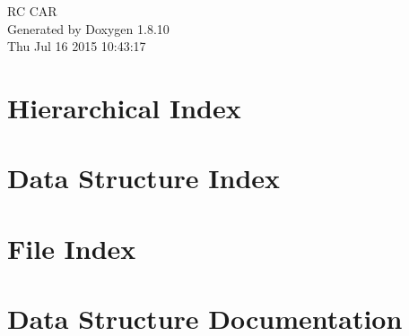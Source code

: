\documentclass[twoside]{book}
\newcommand{\+}{\discretionary{\mbox{\scriptsize$\hookleftarrow$}}{}{}}
\newcommand{\clearemptydoublepage}{%
  \newpage{\pagestyle{empty}\cleardoublepage}%
}
\begin{document}
\hypersetup{pageanchor=false,
             bookmarks=true,
             bookmarksnumbered=true,
             pdfencoding=unicode
            }
\begin{titlepage}
\vspace*{7cm}
\begin{center}%
{\Large R\+C C\+A\+R }\\
\vspace*{1cm}
{\large Generated by Doxygen 1.8.10}\\
\vspace*{0.5cm}
{\small Thu Jul 16 2015 10:43:17}\\
\end{center}
\end{titlepage}
\clearemptydoublepage
\tableofcontents
\clearemptydoublepage
{}
\hypersetup{pageanchor=true}

\chapter{Hierarchical Index}

\chapter{Data Structure Index}

\chapter{File Index}

\chapter{Data Structure Documentation}

























\end{document}
